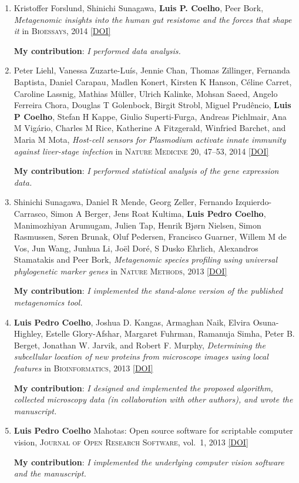\documentclass{article}
\newcommand\showdoi[1]{%
    \href{http://dx.doi.org/#1}{[DOI]}%
}
\newcommand\pubname[1]{\textsc{#1}}
\newcommand\contribution[1]{\relax\hfill\break\textbf{My contribution}: \textit{#1}}
\begin{document}
\begin{enumerate}[resume]
\item Kristoffer Forslund, Shinichi Sunagawa, \textbf{Luis P. Coelho}, Peer
Bork, \emph{Metagenomic insights into the human gut resistome and the forces that
shape it} in \pubname{Bioessays}, 2014 \showdoi{10.1002/bies.201300143}
\contribution{I performed data analysis.}

\item  Peter Liehl,  Vanessa Zuzarte-Luís,  Jennie Chan,  Thomas Zillinger,
Fernanda Baptista,  Daniel Carapau,  Madlen Konert, Kirsten K Hanson, Céline
Carret,  Caroline Lassnig,  Mathias Müller,  Ulrich Kalinke, Mohsan Saeed,
Angelo Ferreira Chora,  Douglas T Golenbock,  Birgit Strobl, Miguel Prudêncio,
\textbf{Luis P Coelho},  Stefan H Kappe,  Giulio Superti-Furga, Andreas
Pichlmair,  Ana M Vigário,  Charles M Rice, Katherine A Fitzgerald, Winfried
Barchet, and Maria M Mota, \emph{Host-cell sensors for Plasmodium activate
innate immunity against liver-stage infection} in \pubname{Nature Medicine} 20,
47--53, 2014 \showdoi{10.1038/nm.3424}
\contribution{I performed statistical analysis of the gene expression data.}

\item Shinichi Sunagawa,  Daniel R Mende,  Georg Zeller,  Fernando
Izquierdo-Carrasco,  Simon A Berger,  Jens Roat Kultima,  \textbf{Luis Pedro
Coelho}, Manimozhiyan Arumugam,  Julien Tap, Henrik Bjørn Nielsen,  Simon
Rasmussen, Søren Brunak,  Oluf Pedersen,  Francisco Guarner, Willem M de Vos,
Jun Wang,  Junhua Li,  Joël Doré,  S Dusko Ehrlich,  Alexandros Stamatakis and
Peer Bork, \emph{Metagenomic species profiling using universal phylogenetic
marker genes} in \pubname{Nature Methods}, 2013 \showdoi{10.1038/nmeth.2693}
\contribution{I implemented the stand-alone version of the published metagenomics tool.}

\item \textbf{Luis Pedro Coelho}, Joshua D.  Kangas, Armaghan Naik, Elvira
Osuna-Highley, Estelle Glory-Afshar, Margaret Fuhrman, Ramanuja Simha, Peter B.
Berget, Jonathan W.  Jarvik, and Robert F. Murphy, \emph{Determining the
subcellular location of new proteins from microscope images using local
features} in \pubname{Bioinformatics}, 2013 \showdoi{10.1093/bioinformatics/btt392}
\contribution{I designed and implemented the proposed algorithm, collected
microscopy data (in collaboration with other authors), and wrote the
manuscript.}

\item \textbf{Luis Pedro Coelho} Mahotas: Open source software for scriptable
computer vision, \pubname{Journal of Open Research Software}, vol.\ 1, 2013
\showdoi{10.5334/jors.ac}
\contribution{I implemented the underlying computer vision software and the manuscript.}


\end{enumerate}
\end{document}
